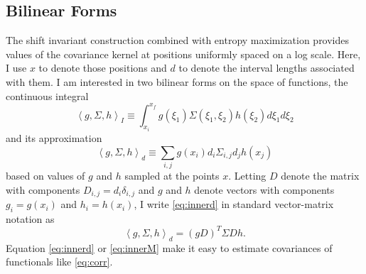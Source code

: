 \documentclass[]{article}
\newcommand\inner[2]{\left<#1,#2\right>}
\newcommand\dum{\xi}
\newcommand\Ddum{d\dum}
\begin{document}
\subsection{Bilinear Forms}
\label{sec:bilinear}

The shift invariant construction combined with entropy maximization
provides values of the covariance kernel at positions uniformly spaced
on a log scale.  Here, I use $x$ to denote those positions and $d$ to
denote the interval lengths associated with them.  I am interested in
two bilinear forms on the space of functions, the continuous integral
\begin{equation*}
  \inner{g,\Sigma}{h}_I \equiv \int_{x_i}^{x_f} g(\dum_1) \Sigma(\dum_1,
  \dum_2) h(\dum_2) \Ddum_1 \Ddum_2
\end{equation*}
and its approximation
\begin{equation}
  \label{eq:innerd}
  \inner{g, \Sigma}{h}_d \equiv \sum_{i,j} g(x_i) d_i \Sigma_{i,j} d_j
  h(x_j)
\end{equation}
based on values of $g$ and $h$ sampled at the points $x$.  Letting $D$
denote the matrix with components $D_{i,j} = d_i \delta_{i,j}$ and $g$
and $h$ denote vectors with components $g_i = g(x_i)$ and $h_i =
h(x_i)$, I write \eqref{eq:innerd} in standard vector-matrix notation
as
\begin{equation}
  \label{eq:innerM}
  \inner{g, \Sigma}{h}_d = \left(g D\right)^T \Sigma D h .
\end{equation}
Equation \eqref{eq:innerd} or \eqref{eq:innerM} make it easy to
estimate covariances of functionals like \eqref{eq:corr}.
\end{document}
